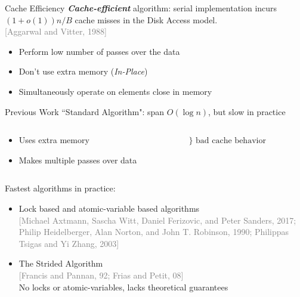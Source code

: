 \documentclass[xcolor=x11names, svgnames, rgb]{beamer}
\newcommand{\defn}[1]       {{\textit{\textbf{\boldmath #1}}}}
\newcommand{\citefont}[1]{{\tiny \textcolor{Gray}{#1}}}
\begin{document}
\begin{frame}[t]{Cache Efficiency}
  \defn{Cache-efficient} algorithm: serial implementation incurs $(1+o(1))n/B$
  cache misses in the Disk Access model. \\
  \citefont{[Aggarwal and Vitter, 1988]}
  \vspace{.5cm}
  \begin{itemize}
    \item Perform low number of passes over the data
    \item Don't use extra memory (\emph{In-Place})
    \item Simultaneously operate on elements close in memory
  \end{itemize}
\end{frame}

\begin{frame}[t]{Previous Work}
  ``Standard Algorithm": span $O(\log n)$, but slow in practice
	\begin{columns}[T] %
	\begin{column}{.65\textwidth}
	\begin{itemize}
    \item Uses extra memory
    \item Makes multiple passes over data
	\end{itemize}
	\end{column}
	\begin{column}{.35\textwidth}
	\hspace{-1cm}$\Biggr\}\text{ bad cache behavior}$
	\end{column}
	\end{columns}
	\vspace{0.4 cm}

  Fastest algorithms in practice: 
	\begin{itemize}
  \item Lock based and atomic-variable based algorithms\\ \citefont{[Michael Axtmann, Sascha Witt, Daniel Ferizovic, and Peter Sanders, 2017; Philip Heidelberger, Alan Norton, and John T. Robinson, 1990; Philippas Tsigas and Yi Zhang, 2003]}
		\item The Strided Algorithm\\ \citefont{[Francis and Pannan, 92; Frias and Petit, 08]}\\ 
      No locks or atomic-variables, lacks theoretical guarantees
	\end{itemize}
	\vspace{0.2cm}
\end{frame}
\end{document}
